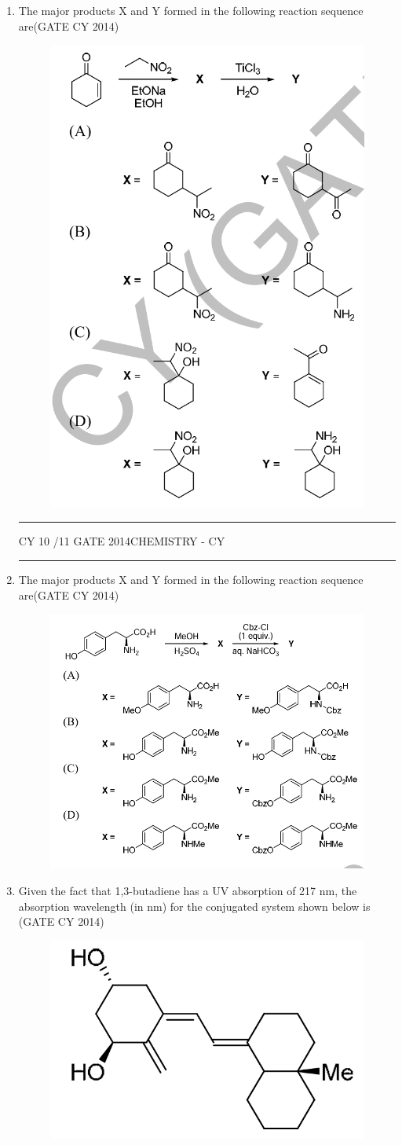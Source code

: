 \documentclass[a4paper,10pt]{exam}
\theoremstyle{remark}
\begin{document}
\begin{enumerate}
\item The major products X and Y formed in the following reaction sequence are\hfill{(GATE CY 2014)}
\begin{figure}[H]
    \centering
    \includegraphics[width=0.4\columnwidth]{figs/Q 52.png}
    \caption{}
    \label{fig:placeholder}
\end{figure}
\vfill
\noindent\rule{\linewidth}{0.4pt}
CY \hfill 10 /11
\newpage
GATE 2014\hfill CHEMISTRY - CY\\
\noindent\rule{\linewidth}{0.4pt}
\item The major products X and Y formed in the following reaction sequence are\hfill{(GATE CY 2014)}
\begin{figure}[H]
    \centering
    \includegraphics[width=0.5\columnwidth]{figs/Q 53.png}
    \caption{}
    \label{fig:placeholder}
\end{figure}
\item Given the fact that 1,3-butadiene has a UV absorption of 217 nm, the absorption wavelength (in 
nm) for the conjugated system shown below is \hfill{(GATE CY 2014)}
\begin{figure}[H]
    \centering
    \includegraphics[width=0.4\linewidth]{figs/Q 54.png}

\end{figure}
\end{enumerate}
\end{document}
